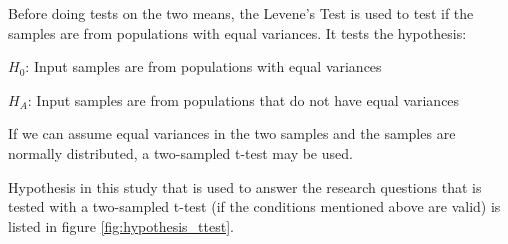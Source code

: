 Before doing tests on the two means, the Levene's Test is used to test if the samples are from populations with equal variances. It tests the hypothesis:\newline %

\centerline{$H_{0}$: Input samples are from populations with equal variances} 
\centerline{$H_{A}$: Input samples are from populations that do not have equal variances}
\vspace{0.2cm}
If we can assume equal variances in the two samples and the samples are normally distributed, a two-sampled t-test may be used. 


Hypothesis in this study that is used to answer the research questions that is tested with a two-sampled t-test (if the conditions mentioned above are valid) is listed in figure \ref{fig:hypothesis_ttest}. 


